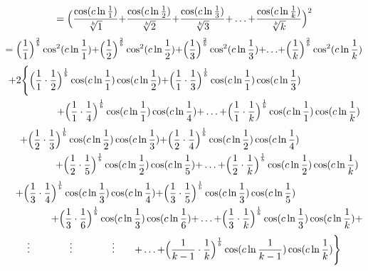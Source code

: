 \documentclass{amsart}
\begin{document}
	\[ = \Bigl( \frac{\cos({c\ln \frac{1}{1}})}{\sqrt[b]{1}} {+} \frac{\cos({c\ln \frac{1}{2}})}{\sqrt[b]{2}} {+} \frac{\cos({c\ln \frac{1}{3}})}{\sqrt[b]{3}} {+} \dots {+} \frac{\cos({c\ln \frac{1}{k}})}{\sqrt[b]{k}} \Bigr)^2 \]
	\[ = \Bigl( \frac{1}{1} \Bigr)^{\frac2b}\cos^2({c \ln \frac{1}{1}}) {+} \Bigl( \frac{1}{2} \Bigr)^{\frac2b}\cos^2({c \ln \frac{1}{2}}) {+} \Bigl( \frac{1}{3} \Bigr)^{\frac2b}\cos^2({c \ln \frac{1}{3}}) {+} {\dots} {+} \Bigl( \frac{1}{k} \Bigr)^{\frac2b}\cos^2({c \ln \frac{1}{k}}) \]
	\[
	\begin{aligned}
		{+}2\Biggl\{ \Bigl( \frac{1}{1} \cdot \frac{1}{2}& \Bigr)^\frac1b \cos(c \ln \frac{1}{1}) \cos(c \ln \frac{1}{2}) {+} \Bigl( \frac{1}{1} \cdot \frac{1}{3} \Bigr)^\frac1b \cos(c \ln \frac{1}{1}) \cos(c \ln \frac{1}{3}) \\ 
		& {+} \Bigl( \frac{1}{1} \cdot \frac{1}{4} \Bigr)^\frac1b \cos(c \ln \frac{1}{1}) \cos(c \ln \frac{1}{4}) {+} \dots {+} \Bigl( \frac{1}{1} \cdot \frac{1}{k} \Bigr)^\frac1b \cos(c \ln \frac{1}{1}) \cos(c \ln \frac{1}{k})  \\ 		
	\end{aligned}
	\]
	\[
	\begin{aligned}
		\quad {+} \Bigl( \frac{1}{2} \cdot \frac{1}{3}& \Bigr)^\frac1b \cos(c \ln \frac{1}{2}) \cos(c \ln \frac{1}{3}) {+} \Bigl( \frac{1}{2} \cdot \frac{1}{4} \Bigr)^\frac1b \cos(c \ln \frac{1}{2}) \cos(c \ln \frac{1}{4}) \\ 
		& {+} \Bigl( \frac{1}{2} \cdot \frac{1}{5} \Bigr)^\frac1b \cos(c \ln \frac{1}{2}) \cos(c \ln \frac{1}{5}) {+} \dots {+} \Bigl( \frac{1}{2} \cdot \frac{1}{k} \Bigr)^\frac1b \cos(c \ln \frac{1}{2}) \cos(c \ln \frac{1}{k})  \\ 		
	\end{aligned}
	\]
	\[
	\begin{aligned}
		\quad {+} \Bigl( \frac{1}{3} \cdot \frac{1}{4}& \Bigr)^\frac1b \cos(c \ln \frac{1}{3}) \cos(c \ln \frac{1}{4}) {+} \Bigl( \frac{1}{3} \cdot \frac{1}{5} \Bigr)^\frac1b \cos(c \ln \frac{1}{3}) \cos(c \ln \frac{1}{5}) \\ 
		& {+} \Bigl( \frac{1}{3} \cdot \frac{1}{6} \Bigr)^\frac1b \cos(c \ln \frac{1}{3}) \cos(c \ln \frac{1}{6}) {+} \dots {+} \Bigl( \frac{1}{3} \cdot \frac{1}{k} \Bigr)^\frac1b \cos(c \ln \frac{1}{3}) \cos(c \ln \frac{1}{k}) {+} \\ 		
	\end{aligned}
	\]
	\[
	\begin{aligned}
		\vdots \qquad\qquad \vdots \qquad\qquad \vdots \qquad {+} \dots {+} \Bigl( \frac{1}{k-1} \cdot \frac{1}{k} \Bigr)^\frac1b \cos(c \ln \frac{1}{k-1}) \cos(c \ln \frac{1}{k}) \Biggr\}
	\end{aligned}
	\]
	\[\]
	
\end{document}
